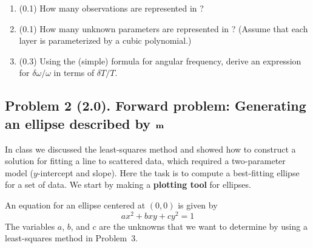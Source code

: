 \documentclass[11pt,titlepage,fleqn]{article}
\begin{document}
\begin{enumerate}
\begin{enumerate}
\item (0.1) How many observations are represented in ? 

\item (0.1) How many unknown parameters are represented in ? (Assume that each layer is parameterized by a cubic polynomial.)

\item (0.3) Using the (simple) formula for angular frequency, derive an expression for $\delta\omega/\omega$ in terms of $\delta T/T$.

\end{enumerate}

\end{enumerate}


\subsection*{Problem 2 (2.0). Forward problem: Generating an ellipse described by $\mbox{${\bf m}$}$}

In class we discussed the least-squares method and showed how to construct a solution for fitting a line to scattered data, which required a  two-parameter model ($y$-intercept and slope). Here the task is to compute a best-fitting ellipse for a set of data. We start by making a {\bf plotting tool} for ellipses.

An equation for an ellipse centered at $(0,0)$ is given by
%
\begin{equation}
ax^2 + bxy + cy^2 = 1
\label{ellipse}
\end{equation}
%
The variables $a$, $b$, and $c$ are the unknowns that we want to determine by using a least-squares method in Problem~3.
\end{document}
